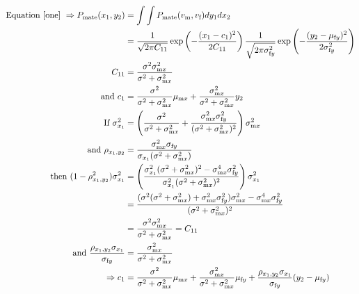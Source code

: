 \documentclass{article}
\newcommand{\x}[1]{\text{#1}}
\begin{document}
\begin{align*}
\text{Equation \ref{one} } \Rightarrow P_\text{mate}(x_1,y_2)&=\int \int P_\text{mate}(v_\x{m},v_\x{f})dy_1dx_2
\\&=\frac{1}{\sqrt{2\pi C_{11}}}\exp\left(-\frac{(x_1-c_1)^2}{2C_{11}}\right)\frac{1}{\sqrt{2\pi \sigma_{\x{f}y}^2}}\exp\left(-\frac{(y_2-\mu_{\x{f}y})^2}{2\sigma_{\x{f}y}^2}\right)
\\ C_{11}&=\frac{\sigma^2\sigma_{\x{m}x}^2}{\sigma^2+\sigma_{\x{m}x}^2}
\\ \text{ and } c_1&=\frac{\sigma^2}{\sigma^2+\sigma_{\x{m}x}^2}\mu_{\x{m}x}+\frac{\sigma_{\x{m}x}^2}{\sigma^2+\sigma_{\x{m}x}^2}y_2
\\ \text{ If } \sigma_{x_1}^2&=\left(\frac{\sigma^2}{\sigma^2+\sigma_{\x{m}x}^2}+\frac{\sigma_{\x{m}x}^2\sigma_{\x{f}y}^2}{(\sigma^2+\sigma_{\x{m}x}^2)^2}\right)\sigma_{\x{m}x}^2
\\ \text{ and } \rho_{x_1,y_2}&=\frac{\sigma_{\x{m}x}^2\sigma_{\x{f}y}}{\sigma_{x_1}(\sigma^2+\sigma_{\x{m}x}^2)}
\\ \text{ then } (1-\rho_{x_1,y_2}^2)\sigma_{x_1}^2&=\left(\frac{\sigma_{x_1}^2(\sigma^2+\sigma_{\x{m}x}^2)^2-\sigma_{\x{m}x}^4\sigma_{\x{f}y}^2}{\sigma_{x_1}^2(\sigma^2+\sigma_{\x{m}x}^2)^2}\right)\sigma_{x_1}^2
\\&=\frac{(\sigma^2(\sigma^2+\sigma_{\x{m}x}^2)+\sigma_{\x{m}x}^2\sigma_{\x{f}y}^2)\sigma_{\x{m}x}^2-\sigma_{\x{m}x}^4\sigma_{\x{f}y}^2}{(\sigma^2+\sigma_{\x{m}x}^2)^2}
\\&=\frac{\sigma^2\sigma_{\x{m}x}^2}{\sigma^2+\sigma_{\x{m}x}^2}=C_{11}
\\\text{ and } \frac{\rho_{x_1,y_2}\sigma_{x_1}}{\sigma_{\x{f}y}}&=\frac{\sigma_{\x{m}x}^2}{\sigma^2+\sigma_{\x{m}x}^2}
\\ \Rightarrow c_1&=\frac{\sigma^2}{\sigma^2+\sigma_{\x{m}x}^2}\mu_{\x{m}x}+\frac{\sigma_{\x{m}x}^2}{\sigma^2+\sigma_{\x{m}x}^2}\mu_{\x{f}y}+\frac{\rho_{x_1,y_2}\sigma_{x_1}}{\sigma_{\x{f}y}}(y_2-\mu_{\x{f}y})
\end{align*}
\end{document}
